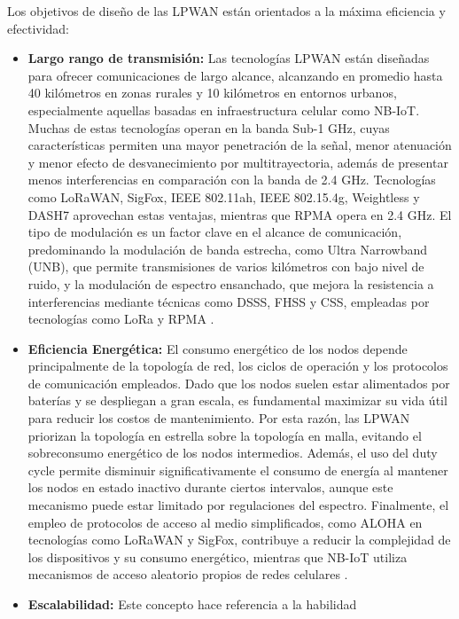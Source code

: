 Los objetivos de diseño de las LPWAN están orientados a la máxima  eficiencia  y
efectividad: \begin{itemize}
      \item \textbf{Largo rango de transmisión:} Las tecnologías LPWAN están
            diseñadas para ofrecer comunicaciones de largo  alcance,  alcanzando
            en promedio hasta 40 kilómetros en zonas rurales y 10 kilómetros  en
            entornos urbanos, especialmente aquellas basadas en  infraestructura
            celular como NB-IoT. Muchas de estas tecnologías operan en la  banda
            Sub-1 GHz, cuyas características permiten una mayor  penetración  de
            la señal, menor atenuación y menor  efecto  de  desvanecimiento  por
            multitrayectoria,  además  de  presentar  menos  interferencias   en
            comparación con la banda  de  2.4  GHz.  Tecnologías  como  LoRaWAN,
            SigFox, IEEE 802.11ah, IEEE 802.15.4g, Weightless y DASH7 aprovechan
            estas ventajas, mientras que RPMA opera  en  2.4  GHz.  El  tipo  de
            modulación es  un  factor  clave  en  el  alcance  de  comunicación,
            predominando la modulación de banda estrecha, como Ultra  Narrowband
            (UNB), que permite transmisiones de varios kilómetros con bajo nivel
            de ruido, y la modulación de  espectro  ensanchado,  que  mejora  la
            resistencia a interferencias mediante técnicas  como  DSSS,  FHSS  y
            CSS,    empleadas    por    tecnologías    como    LoRa    y    RPMA
            \parencite[]{chilamkurthy2022low}.
      \item \textbf{Eficiencia Energética:} El consumo
            energético de los nodos depende principalmente de  la  topología  de
            red, los ciclos  de  operación  y  los  protocolos  de  comunicación
            empleados. Dado que los nodos suelen estar alimentados por  baterías
            y se despliegan a gran escala, es fundamental maximizar su vida útil
            para reducir los costos de mantenimiento. Por esta razón, las  LPWAN
            priorizan la topología en estrella  sobre  la  topología  en  malla,
            evitando  el  sobreconsumo  energético  de  los  nodos  intermedios.
            Además, el uso del duty cycle permite  disminuir  significativamente
            el consumo de energía al  mantener  los  nodos  en  estado  inactivo
            durante  ciertos  intervalos,  aunque  este  mecanismo  puede  estar
            limitado por regulaciones del espectro.  Finalmente,  el  empleo  de
            protocolos  de  acceso  al  medio  simplificados,  como   ALOHA   en
            tecnologías  como  LoRaWAN  y  SigFox,  contribuye  a   reducir   la
            complejidad de los dispositivos y su  consumo  energético,  mientras
            que NB-IoT utiliza mecanismos de acceso aleatorio propios  de  redes
            celulares \parencite[]{chilamkurthy2022low}.
      \item \textbf{Escalabilidad:} Este concepto hace referencia a la habilidad










\end{itemize}
